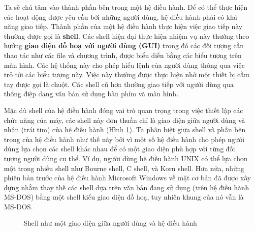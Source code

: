 Ta sẽ chú tâm vào thành phần bên trong một hệ điều hành. Để có thể thực hiện các hoạt động
được yêu cầu bởi những người dùng, hệ điều hành phải có khả năng giao tiếp. Thành phần của
một hệ điều hành thực hiện việc giao tiếp này thường được gọi là \textbf{shell}. Các shell
hiện đại thực hiện nhiệm vụ này thường theo hướng \textbf{giao diện đồ hoạ với người dùng
  (GUI)} trong đó các đối tượng cần thao tác như các file và chương trình, được biểu diễn
bằng các biểu tượng trên màn hình. Các hệ thống này cho phép hiểu lệnh của người dùng
thông qua việc trỏ tới các biểu tượng này. Việc này thường được thực hiện nhờ một thiết bị
cầm tay được gọi là chuột. Các shell cũ hơn thường giao tiếp với người dùng qua thông điệp
dạng văn bản sử dụng bàn phím và màn hình.



Mặc dù shell của hệ điều hành đóng vai trò quan trọng trong việc thiết lập các chức năng
của máy, các shell này đơn thuần chỉ là giao diện giữa người dùng và nhân (trái tim) của
hệ điều hành (Hình \ref{fig:fig3.4}). Ta phân biệt giữa shell và phần bên trong của hệ
điều hành như thế này bởi vì một số hệ điều hành cho phép người dùng lựa chọn các shell
khác nhau để có một giao diện phù hợp với từng đối tượng người dùng cụ thể. Ví dụ, người
dùng hệ điều hành UNIX có thể lựa chọn một trong nhiều shell như Bourne shell, C shell, và
Korn shell. Hơn nữa, những phiên bản trước của hệ điều hành Microsoft Windows về mặt cơ
bản đã được xây dựng nhằm thay thế các shell dựa trên văn bản đang sử dụng (trên hệ điều
hành MS-DOS) bằng một shell kiểu giao diện đồ hoạ, tuy nhiên khung của nó vẫn là MS-DOS.

\begin{figure}[tb]
  \centering {}
  \caption{Shell như một giao diện giữa người dùng và hệ điều hành}
  \label{fig:fig3.4}
\end{figure}

